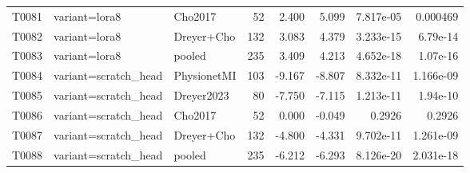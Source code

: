 \begin{longtable}{p{.45in}p{2.6in}p{.75in}rrrrr}
T0081 & variant=lora8 & Cho2017 & 52 & 2.400 & 5.099 & 7.817e-05 & 0.000469 \\
T0082 & variant=lora8 & Dreyer+Cho & 132 & 3.083 & 4.379 & 3.233e-15 & 6.79e-14 \\
T0083 & variant=lora8 & pooled & 235 & 3.409 & 4.213 & 4.652e-18 & 1.07e-16 \\
T0084 & variant=scratch\_\allowbreak{}head & PhysionetMI & 103 & -9.167 & -8.807 & 8.332e-11 & 1.166e-09 \\
T0085 & variant=scratch\_\allowbreak{}head & Dreyer2023 & 80 & -7.750 & -7.115 & 1.213e-11 & 1.94e-10 \\
T0086 & variant=scratch\_\allowbreak{}head & Cho2017 & 52 & 0.000 & -0.049 & 0.2926 & 0.2926 \\
T0087 & variant=scratch\_\allowbreak{}head & Dreyer+Cho & 132 & -4.800 & -4.331 & 9.702e-11 & 1.261e-09 \\
T0088 & variant=scratch\_\allowbreak{}head & pooled & 235 & -6.212 & -6.293 & 8.126e-20 & 2.031e-18 \\
\bottomrule
\end{longtable}
